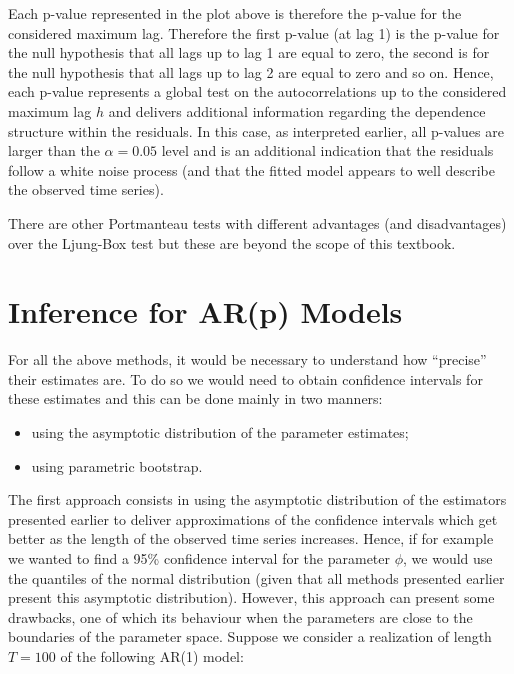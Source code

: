 \documentclass[]{book}
\providecommand{\tightlist}{%
  \setlength{\itemsep}{0pt}\setlength{\parskip}{0pt}}
\theoremstyle{definition}
\theoremstyle{definition}
\theoremstyle{definition}
\theoremstyle{remark}
\begin{document}
Each p-value represented in the plot above is therefore the p-value for
the considered maximum lag. Therefore the first p-value (at lag 1) is
the p-value for the null hypothesis that all lags up to lag 1 are equal
to zero, the second is for the null hypothesis that all lags up to lag 2
are equal to zero and so on. Hence, each p-value represents a global
test on the autocorrelations up to the considered maximum lag \(h\) and
delivers additional information regarding the dependence structure
within the residuals. In this case, as interpreted earlier, all p-values
are larger than the \(\alpha = 0.05\) level and is an additional
indication that the residuals follow a white noise process (and that the
fitted model appears to well describe the observed time series).

There are other Portmanteau tests with different advantages (and
disadvantages) over the Ljung-Box test but these are beyond the scope of
this textbook.

\section{Inference for AR(p) Models}\label{inference-for-arp-models}

For all the above methods, it would be necessary to understand how
``precise'' their estimates are. To do so we would need to obtain
confidence intervals for these estimates and this can be done mainly in
two manners:

\begin{itemize}
\tightlist
\item
  using the asymptotic distribution of the parameter estimates;
\item
  using parametric bootstrap.
\end{itemize}

The first approach consists in using the asymptotic distribution of the
estimators presented earlier to deliver approximations of the confidence
intervals which get better as the length of the observed time series
increases. Hence, if for example we wanted to find a 95\% confidence
interval for the parameter \(\phi\), we would use the quantiles of the
normal distribution (given that all methods presented earlier present
this asymptotic distribution). However, this approach can present some
drawbacks, one of which its behaviour when the parameters are close to
the boundaries of the parameter space. Suppose we consider a realization
of length \(T = 100\) of the following AR(1) model:
\end{document}
